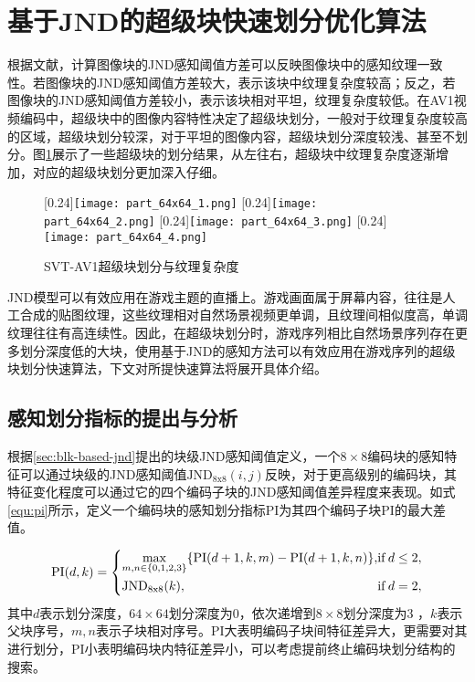   \section{基于JND的超级块快速划分优化算法}
  根据文献\cite{guoqingxiangImprovedAdaptiveQuantization2017}，计算图像块的JND感知阈值方差可以反映图像块中的感知纹理一致性。若图像块的JND感知阈值方差较大，表示该块中纹理复杂度较高；反之，若图像块的JND感知阈值方差较小，表示该块相对平坦，纹理复杂度较低。在AV1视频编码中，超级块中的图像内容特性决定了超级块划分，一般对于纹理复杂度较高的区域，超级块划分较深，对于平坦的图像内容，超级块划分深度较浅、甚至不划分。图\ref{fig:jnd-sb}展示了一些超级块的划分结果，从左往右，超级块中纹理复杂度逐渐增加，对应的超级块划分更加深入仔细。

  \begin{figure}[!hbtp]
    \centering
                    [0.24\textwidth]{\texttt{[image: part\_64x64\_1.png]}\label{fig:jnd-sb-1}}
                    [0.24\textwidth]{\texttt{[image: part\_64x64\_2.png]}}
                    [0.24\textwidth]{\texttt{[image: part\_64x64\_3.png]}}
                    [0.24\textwidth]{\texttt{[image: part\_64x64\_4.png]}\label{fig:jnd-sb-4}}
    \caption{SVT-AV1超级块划分与纹理复杂度}
    \label{fig:jnd-sb}
  \end{figure}

  JND模型可以有效应用在游戏主题的直播上。游戏画面属于屏幕内容，往往是人工合成的贴图纹理，这些纹理相对自然场景视频更单调，且纹理间相似度高，单调纹理往往有高连续性。因此，在超级块划分时，游戏序列相比自然场景序列存在更多划分深度低的大块，使用基于JND的感知方法可以有效应用在游戏序列的超级块划分快速算法，下文对所提快速算法将展开具体介绍。
	\subsection{感知划分指标的提出与分析}

  根据\ref{sec:blk-based-jnd}提出的块级JND感知阈值定义，一个$8\times 8$编码块的感知特征可以通过块级的JND感知阈值$\mathrm{JND_{8x8}}(i, j)$反映，对于更高级别的编码块，其特征变化程度可以通过它的四个编码子块的JND感知阈值差异程度来表现。如式\ref{equ:pi}所示，定义一个编码块的感知划分指标PI为其四个编码子块PI的最大差值。

  \begin{equation} \label{equ:pi}
    \mathrm{PI}(d, k) =
    \begin{dcases}
      \max_{m,n\in \{0, 1, 2, 3\}} \{\mathrm{PI}(d+1, k, m) - \mathrm{PI}(d+1,k, n) \} , &\mathrm{if} \, d \leq 2,\\
      \quad \mathrm{JND_{8x8}}(k), &\mathrm{if}\, d = 2,
    \end{dcases}
  \end{equation}
  其中$d$表示划分深度，$64\times 64$划分深度为0，依次递增到$8\times 8$划分深度为3 ，$k$表示父块序号，$m, n$表示子块相对序号。PI大表明编码子块间特征差异大，更需要对其进行划分，PI小表明编码块内特征差异小，可以考虑提前终止编码块划分结构的搜索。

